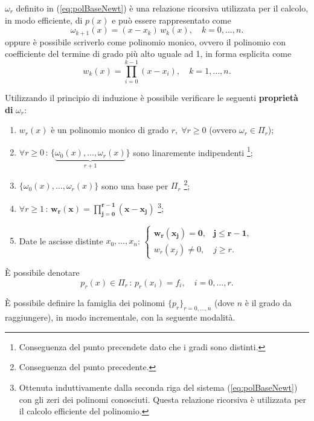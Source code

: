 $\omega_r$ definito in (\ref{eq:polBaseNewt}) è una relazione ricorsiva utilizzata per il calcolo, in modo efficiente, di $p(x)$ e può essere rappresentato come
\begin{equation*}
    \omega_{k+1}(x)=(x-x_k)\, w_k(x),\quad k=0,\hdots, n.
\end{equation*}
oppure è possibile scriverlo come polinomio monico, ovvero il polinomio con coefficiente del termine di grado più alto uguale ad 1, in forma esplicita come
\begin{equation}\label{polBaseNewt2}
    w_k(x)=\prod_{i=0}^{k-1}(x-x_i),\quad k=1,\hdots,n.
\end{equation}

Utilizzando il principio di induzione è possibile verificare le seguenti \textbf{proprietà di} $\omega_r$:
\begin{enumerate}
    \item $w_r(x)$ è un polinomio monico di grado $r,\; \forall r\geq 0$ (ovvero $\omega_r\in\Pi_r$);
    \item $\forall r\geq 0 \, :\, \{\underbrace{\omega_0(x), \hdots, \omega_r(x)}_{r+1}\}$ sono linaremente indipendenti \footnote{Conseguenza del punto precendete dato che i gradi sono distinti.};
    \item $\{\omega_0(x),\hdots,\omega_r(x)\}$ sono una base per $\Pi_r$ \footnote{Conseguenza del punto precedente.};
    \item $\forall r \geq 1\,:\, \boldsymbol{w_r(x)=\prod_{j=0}^{r-1}(x-x_j)}$ \footnote{Ottenuta induttivamente dalla seconda riga del sistema (\ref{eq:polBaseNewt}) con gli zeri dei polinomi conosciuti. Questa relazione ricorsiva è utilizzata per il calcolo efficiente del polinomio.};
    \item Date le ascisse distinte $x_0, \hdots, x_n$:
        $\begin{cases}
        \boldsymbol{w_r(x_j)=0}, & \boldsymbol{j\leq r-1},\\
        w_r(x_j)\neq 0, & j\geq r.
        \end{cases}$
\end{enumerate}

È possibile denotare 
\begin{equation}\label{eq:polNotaz}
    p_r(x)\in\Pi_r\, :\, p_r(x_i)=f_i,\quad i=0,\hdots, r.
\end{equation}

È possibile definire la famiglia dei polinomi $\{p_r\}_{r=0,\hdots,n}$ (dove $n$ è il grado da raggiungere), in modo incrementale, con la seguente modalità.

